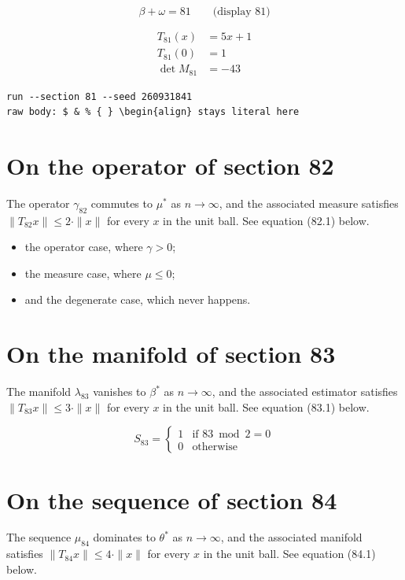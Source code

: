 \documentclass{article}
\begin{document}
$$
\beta + \omega = 81 \qquad \text{(display 81)}
$$

\begin{align}
T_{81}(x) &= 5 x + 1 \\
T_{81}(0) &= 1 \\
\det M_{81} &= -43
\end{align}

\begin{verbatim}
run --section 81 --seed 260931841
raw body: $ & % { } \begin{align} stays literal here
\end{verbatim}

\section{On the operator of section 82}
The operator $\gamma_{82}$ commutes to $\mu^{*}$ as $n \to \infty$,
and the associated measure satisfies $\|T_{82} x\| \leq 2 \cdot \|x\|$
for every $x$ in the unit ball. See equation (82.1) below.

\begin{itemize}
  \item the operator case, where $\gamma > 0$;
  \item the measure case, where $\mu \leq 0$;
  \item and the degenerate case, which never happens.
\end{itemize}

\section{On the manifold of section 83}
The manifold $\lambda_{83}$ vanishes to $\beta^{*}$ as $n \to \infty$,
and the associated estimator satisfies $\|T_{83} x\| \leq 3 \cdot \|x\|$
for every $x$ in the unit ball. See equation (83.1) below.

\begin{equation}
S_{83} = \begin{cases} 1 & \text{if } 83 \bmod 2 = 0 \\ 0 & \text{otherwise} \end{cases}
\end{equation}

\section{On the sequence of section 84}
The sequence $\mu_{84}$ dominates to $\theta^{*}$ as $n \to \infty$,
and the associated manifold satisfies $\|T_{84} x\| \leq 4 \cdot \|x\|$
for every $x$ in the unit ball. See equation (84.1) below.
\end{document}
